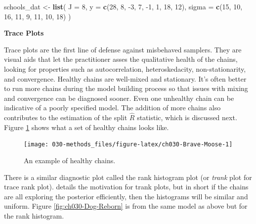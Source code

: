 \documentclass[11pt, oneside, openany]{scrbook}
\newenvironment{Shaded}{\begin{snugshade}}{\end{snugshade}}
\newcommand{\DataTypeTok}[1]{\textcolor[rgb]{0.13,0.29,0.53}{#1}}
\newcommand{\DecValTok}[1]{\textcolor[rgb]{0.00,0.00,0.81}{#1}}
\newcommand{\KeywordTok}[1]{\textcolor[rgb]{0.13,0.29,0.53}{\textbf{#1}}}
\newcommand{\NormalTok}[1]{#1}
\newcommand{\StringTok}[1]{\textcolor[rgb]{0.31,0.60,0.02}{#1}}
\begin{document}
\begin{Shaded}
\begin{Highlighting}[]
\NormalTok{schools_dat <-}\StringTok{ }\KeywordTok{list}\NormalTok{(}
  \DataTypeTok{J =} \DecValTok{8}\NormalTok{,}
  \DataTypeTok{y =} \KeywordTok{c}\NormalTok{(}\DecValTok{28}\NormalTok{,  }\DecValTok{8}\NormalTok{, }\DecValTok{-3}\NormalTok{,  }\DecValTok{7}\NormalTok{, }\DecValTok{-1}\NormalTok{,  }\DecValTok{1}\NormalTok{, }\DecValTok{18}\NormalTok{, }\DecValTok{12}\NormalTok{),}
  \DataTypeTok{sigma =} \KeywordTok{c}\NormalTok{(}\DecValTok{15}\NormalTok{, }\DecValTok{10}\NormalTok{, }\DecValTok{16}\NormalTok{, }\DecValTok{11}\NormalTok{,  }\DecValTok{9}\NormalTok{, }\DecValTok{11}\NormalTok{, }\DecValTok{10}\NormalTok{, }\DecValTok{18}\NormalTok{)}
\NormalTok{)}
\end{Highlighting}
\end{Shaded}

\textbf{Trace Plots}

Trace plots are the first line of defense against misbehaved samplers. They are visual aids that let the practitioner asses the qualitative health of the chains, looking for properties such as autocorrelation, heteroskedacity, non-stationarity, and convergence. Healthy chains are well-mixed and stationary. It's often better to run more chains during the model building process so that issues with mixing and convergence can be diagnosed sooner. Even one unhealthy chain can be indicative of a poorly specified model. The addition of more chains also contributes to the estimation of the split \(\hat{R}\) statistic, which is discussed next. Figure \ref{fig:ch030-Brave-Moose} shows what a set of healthy chains looks like.

\begin{figure}

{\centering \texttt{[image: 030-methods\_files/figure-latex/ch030-Brave-Moose-1]} 

}

\caption{An example of healthy chains.}\label{fig:ch030-Brave-Moose}
\end{figure}

There is a similar diagnostic plot called the rank histogram plot (or \emph{trank} plot for trace rank plot). \citet{vehtari2020rank} details the motivation for trank plots, but in short if the chains are all exploring the posterior efficiently, then the histograms will be similar and uniform. Figure \ref{fig:ch030-Dog-Reborn} is from the same model as above but for the rank histogram.
\end{document}
